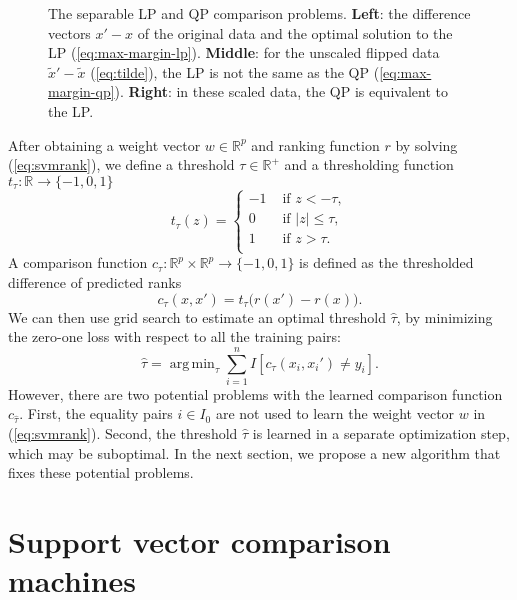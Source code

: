 \documentclass{article}
\newcommand{\RR}{\mathbb R}
\DeclareMathOperator*{\argmin}{arg\,min}
\begin{document}
\begin{figure*}[b!]
  \centering
  
  \vskip -1cm
  \caption{The separable LP and QP comparison problems. \textbf{Left}:
    the difference vectors $x'-x$ of the original data and the optimal
    solution to the LP (\ref{eq:max-margin-lp}). \textbf{Middle}: for
    the unscaled flipped data $\tilde x'-\tilde x$ (\ref{eq:tilde}),
    the LP is not the same as the QP
    (\ref{eq:max-margin-qp}). \textbf{Right}: in these scaled
    data, the QP is equivalent to the LP.}
  \label{fig:hard-margin}
\end{figure*}

After obtaining a weight vector $w\in\RR^p$ and ranking
function $r$ by solving (\ref{eq:svmrank}), we define a threshold
$\tau\in\RR^+$ and a thresholding function
$t_\tau:\RR\rightarrow\{-1,0,1\}$
\begin{equation}
  \label{eq:threshold}
  t_\tau(z) = 
  \begin{cases}
    -1 & \text{ if } z < -\tau, \\
    0 & \text{ if } |z| \leq \tau, \\
    1 & \text{ if } z > \tau. \\
  \end{cases}
\end{equation}
A comparison function $c_\tau:\RR^p\times \RR^p\rightarrow \{-1, 0,
1\}$ is defined as the thresholded difference of predicted ranks
\begin{equation}
  \label{eq:svmrank_c_t}
  c_\tau(x, x') = 
  t_\tau\big(
  r(x') - r(x)
  \big).
\end{equation}
We can then use grid search to estimate an optimal threshold $\hat
\tau$, by minimizing the zero-one loss with respect to all the
training pairs:
\begin{equation}
  \hat \tau = \argmin_{\tau}
  \sum_{i=1}^n
  I\left[ c_\tau(x_i, x_i') \neq y_i \right].
\end{equation}
However, there are two potential problems with the learned comparison
function $c_{\hat\tau}$. First, the equality pairs $i\in I_0$ are not
used to learn the weight vector $w$ in (\ref{eq:svmrank}). Second, the
threshold $\hat \tau$ is learned in a separate optimization step, which
may be suboptimal. In the next section, we propose a new algorithm
that fixes these potential problems.
\section{Support vector comparison machines}
\label{sec:svm-compare}
\end{document}
